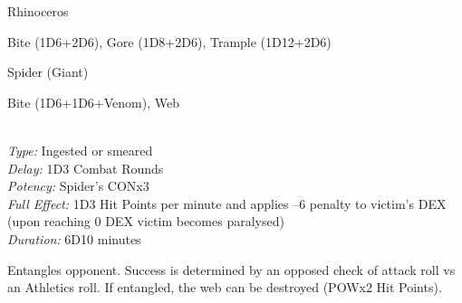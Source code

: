 \begin{samepage}
\begin{monsterbox}{Rhinoceros}
	\basics[%
        hitpoints  = 19, 
	majorwound = 10,
	damagemodifier = +2D6,
	powerpoints = 11,
	movementrate = 23m,
	armor = Thick hide (5 AP),
	]
	\rpghline%
	\stats[ %
		STR = 2D6+21 (26),
		CON = 3D6    (11),
		DEX = 2D6    (7),
		SIZ = 2D6+21 (26),
		INT = 3      (3),
		POW = 3D6    (11),
		CHA = 3      (3)
	]
	\rpghline%
	\begin{rpg-monsteraction}
		Bite (1D6+2D6), Gore (1D8+2D6), Trample (1D12+2D6)
	\end{rpg-monsteraction}
\end{monsterbox}
\end{samepage}


\begin{samepage}
\begin{monsterbox}{Spider (Giant)}
	\basics[%
        hitpoints  = 22, 
	majorwound = 11,
	damagemodifier = +1D6,
	powerpoints = 11,
	movementrate = {15m on land, 23m in web},
	armor = Chitin (4 AP),
	]
	\rpghline%
	\stats[ %
		STR = 2D6+12 (19),
		CON = 3D6+6  (17),
		DEX = 2D6+9  (16),
		SIZ = 4D6+12 (26),
		INT = 8      (8),
		POW = 3D6    (11),
		CHA = 2      (2)
	]
	\rpghline%
	\begin{rpg-monsteraction}
		Bite (1D6+1D6+Venom), Web
	\end{rpg-monsteraction}
	\begin{rpg-monsteraction}\\
		\textit{Type:} Ingested or smeared\\
		\textit{Delay:} 1D3 Combat Rounds\\
		\textit{Potency:} Spider's CONx3\\
		\textit{Full Effect:} 1D3 Hit Points per minute and applies –6 penalty to victim’s DEX (upon reaching 0 DEX victim becomes paralysed)\\ 
		\textit{Duration:} 6D10 minutes
	\end{rpg-monsteraction}
	\begin{rpg-monsteraction}[Web]
		Entangles opponent. Success is determined by an opposed check of attack roll vs an Athletics roll. If entangled, the web can be destroyed (POWx2 Hit Points).
	\end{rpg-monsteraction}


\end{monsterbox}
\end{samepage}


